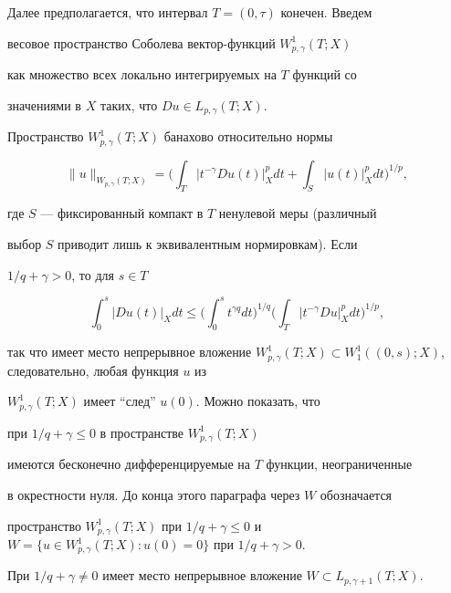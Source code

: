 Далее предполагается, что интервал $T=(0,\tau)$ конечен. Введем


весовое пространство Соболева вектор-функций $W_{p,\gamma}^1(T;X)$


как множество всех локально интегрируемых на $T$ функций со


значениями в $X$ таких, что $D u \in L_{p,\gamma}(T;X)$.


Пространство $W_{p,\gamma}^1(T;X)$ банахово относительно нормы


$$


\|u\|_{W_{p,\gamma}(T;X)}=\bigg(\int_T


|t^{-\gamma} D u(t)|_X^p d t + \int_{S}|u(t)|_X^p d t


\bigg)^{1/p},


$$


где $S$ --- фиксированный компакт в $T$ ненулевой меры (различный


выбор $S$ приводит лишь к эквивалентным нормировкам). Если


$1/q+\gamma>0$, то для $s \in T$


$$


\int_0^s |D u(t)|_X d t \le \bigg(\int_0^s


t^{\gamma q} d t\bigg)^{1/q}


\bigg(\int_T |t^{-\gamma}D u |_X^p d t\bigg)^{1/p},


$$


так что имеет место непрерывное вложение $W_{p,\gamma}^1(T;X)


\subset W_1^1((0,s);X)$, следовательно, любая функция $u$ из


$W_{p,\gamma}^1(T;X)$ имеет ``след'' $u(0)$. Можно показать, что


при $1/q+\gamma \le 0$ в пространстве $W_{p,\gamma}^1(T;X)$


имеются бесконечно дифференцируемые на $T$ функции, неограниченные


в окрестности нуля. До конца этого параграфа через $W$ обозначается


пространство $W_{p,\gamma}^1(T;X)$ при $1/q+\gamma \le 0$ и $W=\{u


\in W_{p,\gamma}^1(T;X): u(0)=0\}$ при $1/q+\gamma>0$.





\begin{lems}\label{Imbedd}


При $1/q+\gamma \ne 0$ имеет место непрерывное вложение $W \subset


L_{p,\gamma+1}(T;X)$.


\end{lems}





